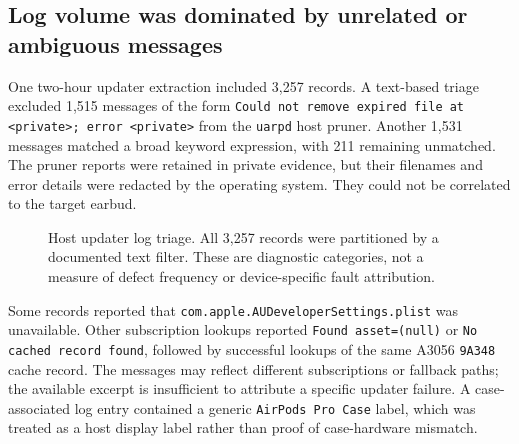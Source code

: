 \documentclass[11pt,letterpaper]{article}
\begin{document}
\subsection{Log volume was dominated by unrelated or ambiguous messages}
One two-hour updater extraction included 3,257 records. A text-based triage excluded 1,515 messages of the form \texttt{Could not remove expired file at <private>; error <private>} from the \texttt{uarpd} host pruner. Another 1,531 messages matched a broad keyword expression, with 211 remaining unmatched. The pruner reports were retained in private evidence, but their filenames and error details were redacted by the operating system. They could not be correlated to the target earbud.

\begin{figure}[htbp]\centering
{}
\caption{Host updater log triage. All 3,257 records were partitioned by a documented text filter. These are diagnostic categories, not a measure of defect frequency or device-specific fault attribution.}\label{fig:triage}
\end{figure}

Some records reported that \texttt{com.apple.AUDeveloperSettings.plist} was unavailable. Other subscription lookups reported \texttt{Found asset=(null)} or \texttt{No cached record found}, followed by successful lookups of the same A3056 \texttt{9A348} cache record. The messages may reflect different subscriptions or fallback paths; the available excerpt is insufficient to attribute a specific updater failure. A case-associated log entry contained a generic \texttt{AirPods Pro Case} label, which was treated as a host display label rather than proof of case-hardware mismatch.
\end{document}
